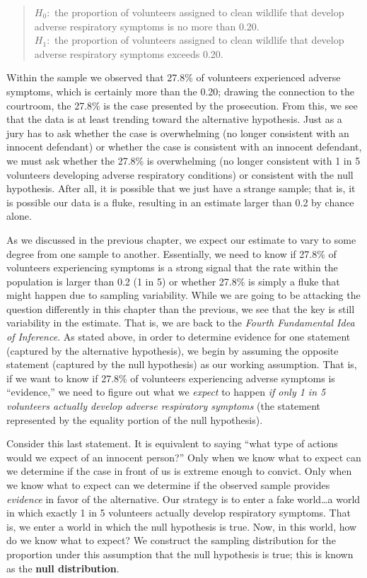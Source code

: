 \documentclass[
  letterpaper,
  DIV=11,
  numbers=noendperiod]{scrreprt}
\theoremstyle{plain}
\theoremstyle{definition}
\theoremstyle{definition}
\theoremstyle{remark}
\begin{document}
\begin{quote}
\(H_0:\) the proportion of volunteers assigned to clean wildlife that
develop adverse respiratory symptoms is no more than 0.20.\\
\(H_1:\) the proportion of volunteers assigned to clean wildlife that
develop adverse respiratory symptoms exceeds 0.20.
\end{quote}

Within the sample we observed that 27.8\% of volunteers experienced
adverse symptoms, which is certainly more than the 0.20; drawing the
connection to the courtroom, the 27.8\% is the case presented by the
prosecution. From this, we see that the data is at least trending toward
the alternative hypothesis. Just as a jury has to ask whether the case
is overwhelming (no longer consistent with an innocent defendant) or
whether the case is consistent with an innocent defendant, we must ask
whether the 27.8\% is overwhelming (no longer consistent with 1 in 5
volunteers developing adverse respiratory conditions) or consistent with
the null hypothesis. After all, it is possible that we just have a
strange sample; that is, it is possible our data is a fluke, resulting
in an estimate larger than 0.2 by chance alone.

As we discussed in the previous chapter, we expect our estimate to vary
to some degree from one sample to another. Essentially, we need to know
if 27.8\% of volunteers experiencing symptoms is a strong signal that
the rate within the population is larger than 0.2 (1 in 5) or whether
27.8\% is simply a fluke that might happen due to sampling variability.
While we are going to be attacking the question differently in this
chapter than the previous, we see that the key is still variability in
the estimate. That is, we are back to the \emph{Fourth Fundamental Idea
of Inference}. As stated above, in order to determine evidence for one
statement (captured by the alternative hypothesis), we begin by assuming
the opposite statement (captured by the null hypothesis) as our working
assumption. That is, if we want to know if 27.8\% of volunteers
experiencing adverse symptoms is ``evidence,'' we need to figure out
what we \emph{expect} to happen \emph{if only 1 in 5 volunteers actually
develop adverse respiratory symptoms} (the statement represented by the
equality portion of the null hypothesis).

Consider this last statement. It is equivalent to saying ``what type of
actions would we expect of an innocent person?'' Only when we know what
to expect can we determine if the case in front of us is extreme enough
to convict. Only when we know what to expect can we determine if the
observed sample provides \emph{evidence} in favor of the alternative.
Our strategy is to enter a fake world\ldots a world in which exactly 1
in 5 volunteers actually develop respiratory symptoms. That is, we enter
a world in which the null hypothesis is true. Now, in this world, how do
we know what to expect? We construct the sampling distribution for the
proportion under this assumption that the null hypothesis is true; this
is known as the \textbf{null distribution}.
\end{document}
